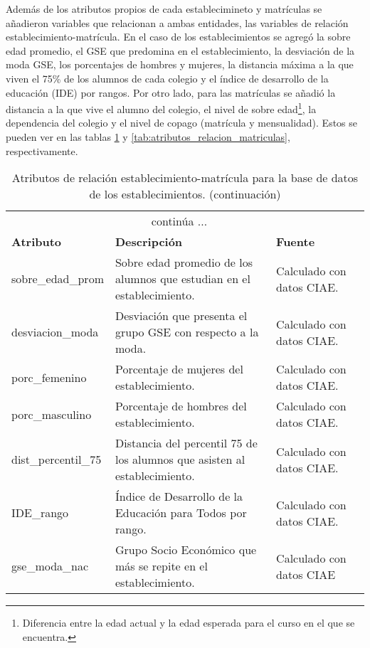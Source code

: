 \begin{itemize}
Además de los atributos propios de cada establecimineto y matrículas se añadieron variables que relacionan a ambas entidades, las variables de relación establecimiento-matrícula. En el caso de los establecimientos se agregó la sobre edad promedio, el GSE que predomina en el establecimiento, la desviación de la moda GSE, los porcentajes de hombres y mujeres, la distancia máxima a la que viven el 75\% de los alumnos de cada colegio y el índice de desarrollo de la educación (IDE) por rangos. Por otro lado, para las matrículas se añadió la distancia a la que vive el alumno del colegio, el nivel de sobre edad\footnote{Diferencia entre la edad actual y la edad esperada para el curso en el que se encuentra.}, la dependencia del colegio y el nivel de copago (matrícula y mensualidad). Estos se pueden ver en las tablas \ref{tab:atributos_relacion_establecimientos} y \ref{tab:atributos_relacion_matriculas}, respectivamente.

\begin{footnotesize}
\begin{longtable}{|p{}|p{}|p{}|p{}|}
\caption{Atributos de relación establecimiento-matrícula para la base de datos de los establecimientos.}\label{tab:atributos_relacion_establecimientos}\\
\hline
\endfirsthead
\caption[]{Atributos de relación establecimiento-matrícula para la base de datos de los establecimientos. (continuación)}\\
\hline
\endhead
\hline
\multicolumn{3}{|c|}{continúa $\ldots$}\\
\hline
\endfoot
\hline
\endlastfoot
\textbf{Atributo}  & \textbf{Descripción} & \textbf{Fuente}\\ \hline
sobre\_edad\_prom & Sobre edad promedio de los alumnos que estudian en el establecimiento. & Calculado con datos CIAE. \\ \hline
desviacion\_moda & Desviación que presenta el grupo GSE con respecto a la moda. & Calculado con datos CIAE. \\ \hline
porc\_femenino & Porcentaje de mujeres del establecimiento. & Calculado con datos CIAE. \\ \hline
porc\_masculino & Porcentaje de hombres del establecimiento. & Calculado con datos CIAE. \\ \hline
dist\_percentil\_75 & Distancia del percentil 75 de los alumnos que asisten al establecimiento. & Calculado con datos CIAE.\\ \hline
IDE\_rango & Índice de Desarrollo de la Educación para Todos por rango. & Calculado con datos CIAE. \\ \hline
gse\_moda\_nac & Grupo Socio Económico que más se repite en el establecimiento. & Calculado con datos CIAE \\ \hline
\end{longtable} 
\end{footnotesize}


\end{itemize}
